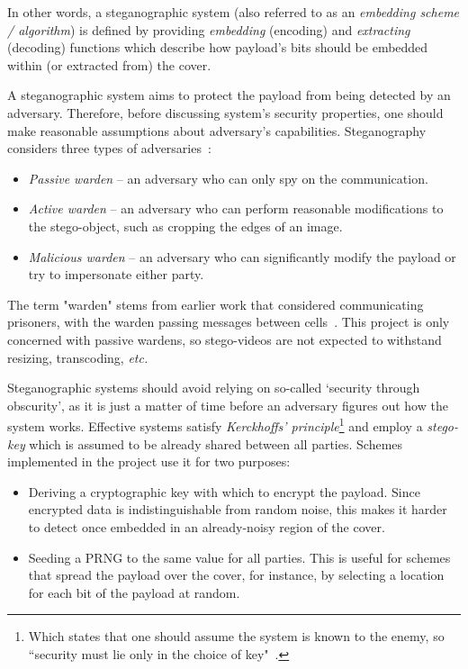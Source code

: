 \documentclass[12pt,british,twoside,notitlepage,usenames,dvipsnames,hypens,final]{report}
\numberwithin{equation}{section}
\numberwithin{figure}{section}
\begin{document}
In other words, a steganographic system (also referred to as an \emph{embedding scheme / algorithm}) is defined by providing \emph{embedding} (encoding) and \emph{extracting} (decoding) functions which describe how payload's bits should be embedded within (or extracted from) the cover.

A steganographic system aims to protect the payload from being detected by an adversary. Therefore, before discussing system's security properties, one should make reasonable assumptions about adversary's capabilities. Steganography considers three types of adversaries~\cite{craver1998public}:
\begin{itemize}
\item \emph{Passive warden} -- an adversary who can only spy on the communication.
\item \emph{Active warden} -- an adversary who can perform reasonable modifications to the stego-object, such as cropping the edges of an image.
\item \emph{Malicious warden} -- an adversary who can significantly modify the payload or try to impersonate either party.
\end{itemize}
The term "warden" stems from earlier work that considered communicating prisoners, with the warden passing messages between cells~\cite{craver1998public}. This project is only concerned with passive wardens, so stego-videos are not expected to withstand resizing, transcoding, \emph{etc.}

Steganographic systems should avoid relying on so-called `security through obscurity', as it is just a matter of time before an adversary figures out how the system works. Effective systems satisfy \emph{Kerckhoffs' principle}\footnote{Which states that one should assume the system is known to the enemy, so ``security must lie only in the choice of key"~\cite{infohiding-survey}.} and employ a \emph{stego-key} which is assumed to be already shared between all parties. Schemes implemented in the project use it for two purposes:

\label{why-encrypt}
\begin{itemize}
\item Deriving a cryptographic key with which to encrypt the payload. Since encrypted data is indistinguishable from random noise, this makes it harder to detect once embedded in an already-noisy region of the cover.

\item Seeding a PRNG to the same value for all parties. This is useful for schemes that spread the payload over the cover, for instance, by selecting a location for each bit of the payload at random.
\end{itemize}
\end{document}
